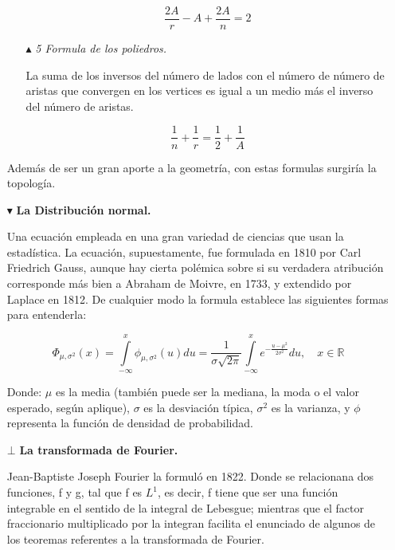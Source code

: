 \documentclass[12pt,letterpaper]{article}
\begin{document}
\begin{itemize}
\begin{itemize}
            $$\frac{2A}{r}-A+\frac{2A}{n}=2$$
            
            \item[$\blacktriangle$] \textit{5 Formula de los poliedros.}\newline

            La suma de los inversos del número de lados con el número de número de aristas que convergen en los vertices es igual a un medio más el inverso del número de aristas.
            
            $$\frac{1}{n}+\frac{1}{r}=\frac{1}{2}+\frac{1}{A}$$
            
        \end{itemize}

    Además de ser un gran aporte a la geometría, con estas formulas surgiría la topología.\newline
    
    \item[$\blacktriangledown$] \textbf{La Distribución normal.}\newline
    
    Una ecuación empleada en una gran variedad de ciencias que usan la estadística. La ecuación, supuestamente, fue formulada en 1810 por Carl Friedrich Gauss, aunque hay cierta polémica sobre si su verdadera atribución corresponde más bien a Abraham de Moivre, en 1733, y extendido por Laplace en 1812. De cualquier modo la formula establece las siguientes formas para entenderla:
    
    $$\Phi _{\mu ,\sigma ^{2}}(x)=\int \limits_{-\infty}^{x} \phi _{\mu ,\sigma ^{2}}(u)du=\frac{1}{\sigma \sqrt{2\pi }}\int \limits_{-\infty}^{x}e^{-\frac{{u-\mu}^{2}}{2\sigma ^{2}}}du, \quad x\in \mathds{R}$$

    Donde: $\mu$ es la media (también puede ser la mediana, la moda o el valor esperado, según aplique), $\sigma$ es la desviación típica, $\sigma^{2}$ es la varianza, y $\phi$  representa la función de densidad de probabilidad.\newline

    \item[$\bot$] \textbf{La transformada de Fourier.}\newline
    
    Jean-Baptiste Joseph Fourier la formuló en 1822. Donde se relacionana dos funciones, f y g, tal que f es $L^{1}$, es decir, f tiene que ser una función integrable en el sentido de la integral de Lebesgue; mientras que el factor fraccionario multiplicado por la integran facilita el enunciado de algunos de los teoremas referentes a la transformada de Fourier.


\end{itemize}
\end{document}
